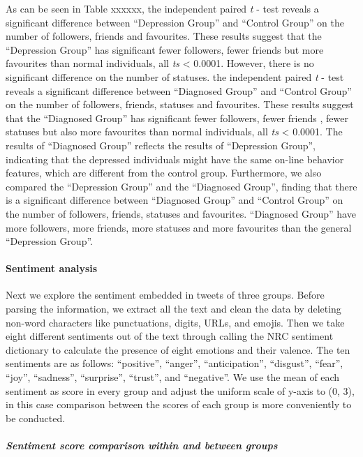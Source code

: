 \documentclass[]{article}
\let\oldparagraph\paragraph
\renewcommand{\paragraph}[1]{\oldparagraph{#1}\mbox{}}
\let\oldsubparagraph\subparagraph
\renewcommand{\subparagraph}[1]{\oldsubparagraph{#1}\mbox{}}
\begin{document}
As can be seen in Table xxxxxx, the independent paired \emph{t} - test
reveals a significant difference between ``Depression Group'' and
``Control Group'' on the number of followers, friends and favourites.
These results suggest that the ``Depression Group'' has significant
fewer followers, fewer friends but more favourites than normal
individuals, all \emph{ts} \textless{} 0.0001. However, there is no
significant difference on the number of statuses. the independent paired
\emph{t} - test reveals a significant difference between ``Diagnosed
Group'' and ``Control Group'' on the number of followers, friends,
statuses and favourites. These results suggest that the ``Diagnosed
Group'' has significant fewer followers, fewer friends , fewer statuses
but also more favourites than normal individuals, all \emph{ts}
\textless{} 0.0001. The results of ``Diagnosed Group'' reflects the
results of ``Depression Group'', indicating that the depressed
individuals might have the same on-line behavior features, which are
different from the control group. Furthermore, we also compared the
``Depression Group'' and the ``Diagnosed Group'', finding that there is
a significant difference between ``Diagnosed Group'' and ``Control
Group'' on the number of followers, friends, statuses and favourites.
``Diagnosed Group'' have more followers, more friends, more statuses and
more favourites than the general ``Depression Group''.

\hypertarget{sentiment-analysis}{%
\paragraph{Sentiment analysis}\label{sentiment-analysis}}

Next we explore the sentiment embedded in tweets of three groups. Before
parsing the information, we extract all the text and clean the data by
deleting non-word characters like punctuations, digits, URLs, and
emojis. Then we take eight different sentiments out of the text through
calling the NRC sentiment dictionary to calculate the presence of eight
emotions and their valence. The ten sentiments are as follows:
``positive'', ``anger'', ``anticipation'', ``disgust'', ``fear'',
``joy'', ``sadness'', ``surprise'', ``trust'', and ``negative''. We use
the mean of each sentiment as score in every group and adjust the
uniform scale of y-axis to (0, 3), in this case comparison between the
scores of each group is more conveniently to be conducted.

\hypertarget{sentiment-score-comparison-within-and-between-groups}{%
\subparagraph{Sentiment score comparison within and between
groups}\label{sentiment-score-comparison-within-and-between-groups}}
\end{document}
